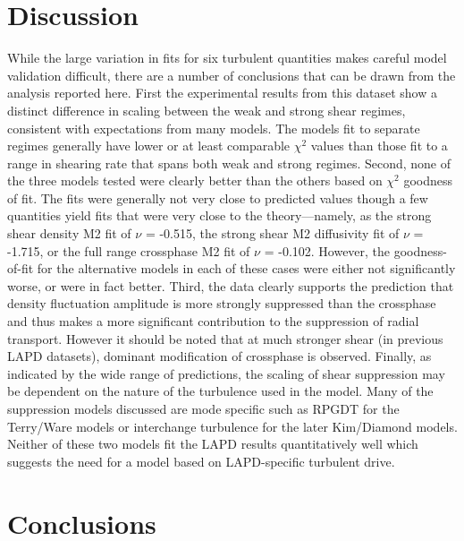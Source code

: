 \documentclass[aip,pop,amsmath,amssymb,preprint,superscriptaddress]{revtex4-1} %
\begin{document}
\section{Discussion}

While the large variation in fits for six turbulent quantities makes
careful model validation difficult, there are a number of conclusions
that can be drawn from the analysis reported here. First the
experimental results from this dataset show a distinct difference in
scaling between the weak and strong shear regimes, consistent with
expectations from many models. The models fit to separate regimes generally have lower or at least comparable $\chi^{2}$ values than those fit to a range in shearing rate that spans both weak and strong regimes. Second, none of the three models tested were clearly better than the others based on $\chi^{2}$ goodness of fit. The fits were generally not very close to predicted values though a few quantities yield fits that were very close to the theory---namely, as the strong shear density M2 fit of $\nu$ = -0.515, the strong shear M2 diffusivity fit of $\nu$ = -1.715, or the full range crossphase M2 fit of $\nu$ = -0.102. However, the goodness-of-fit for the alternative models in each of these cases were either not significantly worse, or were in fact better. Third, the data clearly supports the prediction that
density fluctuation amplitude is more strongly suppressed than the
crossphase and thus makes a more significant contribution to the
suppression of radial transport.  However it should be noted that at
much stronger shear (in previous LAPD datasets), dominant
modification of crossphase is observed.  Finally, as indicated by the
wide range of predictions, the scaling of shear suppression may be
dependent on the nature of the turbulence used in the model. Many of
the suppression models discussed are mode specific such as
RPGDT for the Terry/Ware models or interchange turbulence
for the later Kim/Diamond models. Neither of these two models fit the
LAPD results quantitatively well which suggests the need for a
model based on LAPD-specific turbulent drive.  

\section{Conclusions}
\end{document}
